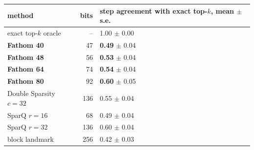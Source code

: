 \begin{tabular}{lrl}
\toprule
method & bits & step agreement with exact top-$k$, mean $\pm$ s.e. \\
\midrule
exact top-$k$ oracle & -- & 1.00 $\pm$ 0.00 \\
\textbf{Fathom 40} & 47 & \textbf{0.49} $\pm$ 0.04 \\
\textbf{Fathom 48} & 56 & \textbf{0.53} $\pm$ 0.04 \\
\textbf{Fathom 64} & 74 & \textbf{0.54} $\pm$ 0.04 \\
\textbf{Fathom 80} & 92 & \textbf{0.60} $\pm$ 0.05 \\
Double Sparsity $c{=}32$ & 136 & 0.55 $\pm$ 0.04 \\
SparQ $r{=}16$ & 68 & 0.49 $\pm$ 0.04 \\
SparQ $r{=}32$ & 136 & 0.60 $\pm$ 0.04 \\
block landmark & 256 & 0.42 $\pm$ 0.03 \\
\bottomrule
\end{tabular}